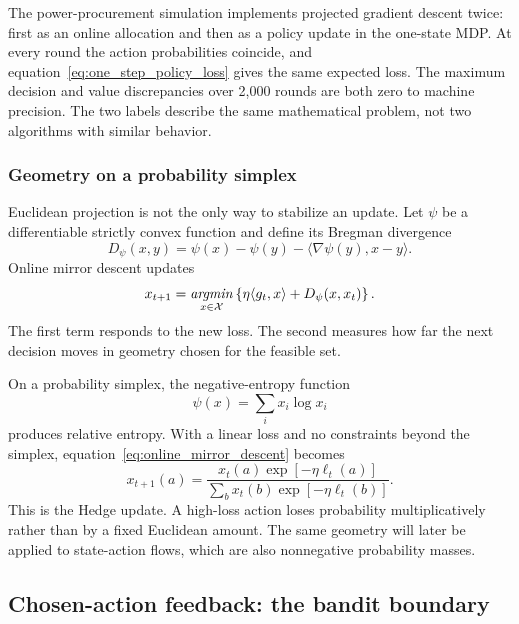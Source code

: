 The power-procurement simulation implements projected gradient descent twice: first as an online allocation and then as a policy update in the one-state MDP. At every round the action probabilities coincide, and equation~\eqref{eq:one_step_policy_loss} gives the same expected loss. The maximum decision and value discrepancies over 2,000 rounds are both zero to machine precision. The two labels describe the same mathematical problem, not two algorithms with similar behavior.

\subsubsection{Geometry on a probability simplex}
\label{sec:online_entropy_geometry}

Euclidean projection is not the only way to stabilize an update. Let $\psi$ be a differentiable strictly convex function and define its Bregman divergence
\begin{equation}
D_\psi(x,y)
=
\psi(x)-\psi(y)-\langle\nabla\psi(y),x-y\rangle.
\label{eq:online_bregman}
\end{equation}
Online mirror descent updates
\begin{equation}
x_{t+1}
=
\mathop{\it argmin}_{x\in\mathcal X}
\left\{
\eta\langle g_t,x\rangle+D_\psi(x,x_t)
\right\}.
\label{eq:online_mirror_descent}
\end{equation}
The first term responds to the new loss. The second measures how far the next decision moves in geometry chosen for the feasible set.

On a probability simplex, the negative-entropy function
\[
\psi(x)=\sum_i x_i\log x_i
\]
produces relative entropy. With a linear loss and no constraints beyond the simplex, equation~\eqref{eq:online_mirror_descent} becomes
\begin{equation}
x_{t+1}(a)
=
\frac{x_t(a)\exp[-\eta\ell_t(a)]}
{\sum_bx_t(b)\exp[-\eta\ell_t(b)]}.
\label{eq:hedge_update}
\end{equation}
This is the Hedge update. A high-loss action loses probability multiplicatively rather than by a fixed Euclidean amount. The same geometry will later be applied to state-action flows, which are also nonnegative probability masses.

\subsection{Chosen-action feedback: the bandit boundary}
\label{sec:online_bandit_boundary}

